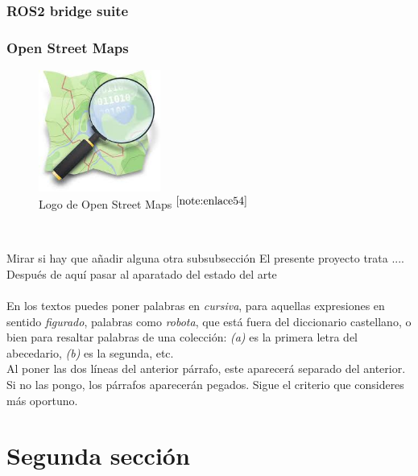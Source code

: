 \subsubsection{ROS2 bridge suite}

\subsubsection{Open Street Maps}


\begin{figure} [h!]
	\begin{center}
		\includegraphics[width=4cm]{figs/osm.png}
	\end{center}
	\caption{Logo de Open Street Maps $^{\ref{note:enlace54}}$} 
	\label{fig:osm}
\end{figure}\

\setcounter{footnote}{54} %


Mirar si hay que añadir alguna otra subsubsección
El presente proyecto trata ....\\


Después de aquí pasar al aparatado del estado del arte \\\\

En los textos puedes poner palabras en \textit{cursiva}, para aquellas expresiones en sentido \textit{figurado}, palabras como \textit{robota}, que está fuera del diccionario castellano, o bien para resaltar palabras de una colección: \textit{(a)} es la primera letra del abecedario, \textit{(b)} es la segunda, etc.\\

Al poner las dos líneas del anterior párrafo, este aparecerá separado del anterior. Si no las pongo, los párrafos aparecerán pegados. Sigue el criterio que consideres más oportuno.

\section{Segunda sección}
\label{sec:segundaseccion}

